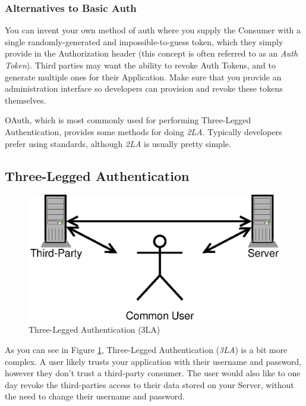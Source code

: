 \documentclass{book}
\begin{document}
\subsubsection{Alternatives to Basic Auth}

You can invent your own method of auth where you supply the Consumer with a single randomly-generated and impossible-to-guess token, which they simply provide in the Authorization header (this concept is often referred to as an \emph{Auth Token}). Third parties may want the ability to revoke Auth Tokens, and to generate multiple ones for their Application. Make sure that you provide an administration interface so developers can provision and revoke these tokens themselves.

OAuth, which is most commonly used for performing Three-Legged Authentication, provides some methods for doing \emph{2LA}. Typically developers prefer using standards, although \emph{2LA} is usually pretty simple.

\subsection{Three-Legged Authentication}

\begin{figure}[!htb]
\centering
\includegraphics[scale=.6]{images/three-legged.eps}
\caption{Three-Legged Authentication (3LA)}
\label{fig:threelegged}
\end{figure}

As you can see in Figure \ref{fig:threelegged}, Three-Legged Authentication (\emph{3LA}) is a bit more complex. A user likely trusts your application with their username and password, however they don't trust a third-party consumer. The user would also like to one day revoke the third-parties access to their data stored on your Server, without the need to change their username and password.
\end{document}
